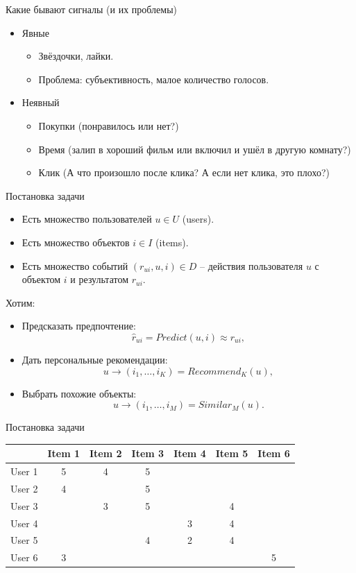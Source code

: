 \documentclass[9pt]{beamer}
\begin{document}
\begin{frame}{Какие бывают сигналы (и их проблемы)}
    \begin{itemize}
        \item Явные
        \begin{itemize}
            \item Звёздочки, лайки.
            \item Проблема: субъективность, малое количество голосов.
        \end{itemize}
        \item Неявный
        \begin{itemize}
            \item Покупки (понравилось или нет?)
            \item Время (залип в хороший фильм или включил и ушёл в другую комнату?)
            \item Клик (А что произошло после клика? А если нет клика, это плохо?)
        \end{itemize}
    \end{itemize}
\end{frame}

\begin{frame}{Постановка задачи}
\begin{itemize}
    \item Есть множество пользователей $u\in U$ (users).
    \item Есть множество объектов $i\in I$ (items).
    \item Есть множество событий $(r_{ui}, u, i)\in D$ – действия пользователя $u$ с объектом $i$ и результатом $r_{ui}$.
\end{itemize}

Хотим:
\begin{itemize}
    \item Предсказать предпочтение:
    $$\hat r_{ui} = Predict(u, i) \approx r_{ui},$$
    \item Дать персональные рекомендации:
    $$u\rightarrow (i_1, \ldots,i_K)=Recommend_K(u),$$
    \item Выбрать похожие объекты:
    $$u\rightarrow (i_1, \ldots,i_M)=Similar_M(u).$$ 
\end{itemize}
\end{frame}

\begin{frame}{Постановка задачи}
\begin{center}
    \begin{tabular}{|c|c|c|c|c|c|c|}
    \hline
         & Item 1 & Item 2 & Item 3 & Item 4 & Item 5 & Item 6 \\\hline
    User 1 & 5 & 4 & 5 & & & \\\hline
    User 2 & 4 & & 5 & & & \\\hline
    User 3 & & 3 & 5 & & 4 & \\\hline
    User 4 & & & & 3 & 4 & \\\hline
    User 5 & & & 4 & 2 & 4 & \\\hline
    User 6 & 3 & & & & & 5\\\hline
    \end{tabular}
\end{center}
\end{frame}
\end{document}
